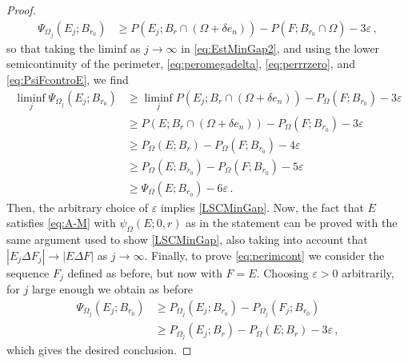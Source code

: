 \documentclass[10pt,a4paper]{amsart}
\newcommand{\difsim}{\Delta}
\newcommand{\e}{\varepsilon}
\newcommand{\pr}{P_{\Omega}}
\newcommand{\p}{P}
\begin{document}
\begin{proof}
\begin{align} \label{eq:EstMinGap2}
\Psi_{\Omega_{j}}(E_{j};B_{r_{0}}) & \ge \p(E_{j};B_{r} \cap (\Omega+\delta e_{n})) - \p(F;B_{r_{0}} \cap \Omega) -3\e\,,
\end{align}
so that taking the liminf as $j\to\infty$ in \eqref{eq:EstMinGap2}, and using the lower semicontinuity of the perimeter, \eqref{eq:peromegadelta}, \eqref{eq:perrrzero}, and \eqref{eq:PsiFcontroE}, we find
\begin{align*}
\liminf_{j} \Psi_{\Omega_{j}}(E_{j};B_{r_{0}}) &\ge \liminf_{j} \p(E_{j};B_{r} \cap (\Omega+\delta e_{n})) - \pr(F;B_{r_{0}}) -3\e\\
&\ge \p(E;B_{r} \cap (\Omega+\delta e_{n})) - \pr(F;B_{r_{0}}) -3\e\\
&\ge \pr(E;B_{r}) - \pr(F;B_{r_{0}}) -4\e\\
&\ge \pr(E;B_{r_{0}}) - \pr(F;B_{r_{0}}) -5\e\\
&\ge \Psi_{\Omega}(E;B_{r_{0}}) - 6\e\,.
\end{align*}
Then, the arbitrary choice of $\e$ implies \eqref{LSCMinGap}. Now, the fact that $E$ satisfies \eqref{eq:A-M} with $\psi_{\Omega}(E;0,r)$ as in the statement can be proved with the same argument used to show \eqref{LSCMinGap}, also taking into account that $|E_{j}\difsim F_{j}|\to |E\difsim F|$ as $j\to\infty$. Finally, to prove \eqref{eq:perimcont} we consider the sequence $F_{j}$ defined as before, but now with $F=E$. Choosing $\e>0$ arbitrarily, for $j$ large enough we obtain as before
\begin{align*}
\Psi_{\Omega_{j}}(E_{j};B_{r_{0}}) &\ge \p_{\Omega_{j}}(E_{j};B_{r_{0}}) - \p_{\Omega_{j}}(F_{j};B_{r_{0}})\\
&\ge \p_{\Omega_{j}}(E_{j};B_{r}) - \pr(E;B_{r}) - 3\e\,,
\end{align*}
which gives the desired conclusion.
\end{proof}
\end{document}
